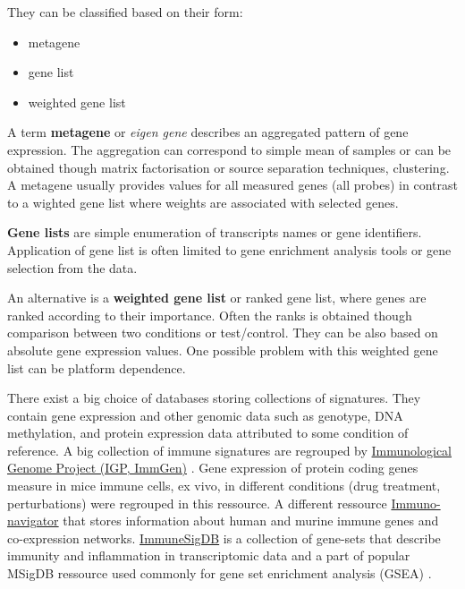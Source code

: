 \documentclass[12pt,]{book}
\providecommand{\tightlist}{%
  \setlength{\itemsep}{0pt}\setlength{\parskip}{0pt}}
\theoremstyle{definition}
\theoremstyle{definition}
\theoremstyle{definition}
\theoremstyle{remark}
\begin{document}
They can be classified based on their form:

\begin{itemize}
\tightlist
\item
  metagene
\item
  gene list
\item
  weighted gene list
\end{itemize}

A term \textbf{metagene} or \emph{eigen gene} describes an aggregated
pattern of gene expression. The aggregation can correspond to simple
mean of samples or can be obtained though matrix factorisation or source
separation techniques, clustering. A metagene usually provides values
for all measured genes (all probes) in contrast to a wighted gene list
where weights are associated with selected genes.

\textbf{Gene lists} are simple enumeration of transcripts names or gene
identifiers. Application of gene list is often limited to gene
enrichment analysis tools or gene selection from the data.

An alternative is a \textbf{weighted gene list} or ranked gene list,
where genes are ranked according to their importance. Often the ranks is
obtained though comparison between two conditions or test/control. They
can be also based on absolute gene expression values\citep{Lyons2017}.
One possible problem with this weighted gene list can be platform
dependence.

There exist a big choice of databases storing collections of signatures.
They contain gene expression and other genomic data such as genotype,
DNA methylation, and protein expression data attributed to some
condition of reference. A big collection of immune signatures are
regrouped by \href{https://www.immgen.org/}{Immunological Genome Project
(IGP, ImmGen)} \citep{Heng2008}. Gene expression of protein coding genes
measure in mice immune cells, ex vivo, in different conditions (drug
treatment, perturbations) were regrouped in this ressource. A different
ressource
\href{https://sysimm.ifrec.osaka-u.ac.jp/immuno-navigator/}{Immuno-navigator}
\citep{Vandenbon2016} that stores information about human and murine
immune genes and co-expression networks.
\href{http://software.broadinstitute.org/gsea/msigdb/collections.jsp}{ImmuneSigDB}
is a collection of gene-sets that describe immunity and inflammation in
transcriptomic data \citep{Godec2016} and a part of popular MSigDB
ressource used commonly for gene set enrichment analysis (GSEA)
\citep{Subramanian2005}.
\end{document}
